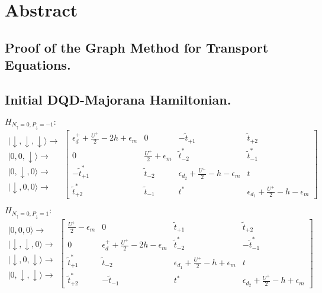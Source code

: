 \chapter{Abstract}



\section{Proof of the Graph Method for Transport Equations.\label{sec:AbsGraphmethod}}



\section{Initial DQD-Majorana Hamiltonian.\label{chap:Double-Dot-Majorana-Hamiltonian.}}

$H_{N_{\uparrow}=0,P_{\downarrow}=-1}:$
\[
\begin{array}{c}
\vert\downarrow,\downarrow,\downarrow\rangle\rightarrow\\
\vert0,0,\downarrow\rangle\rightarrow\\
\vert0,\downarrow,0\rangle\rightarrow\\
\vert\downarrow,0,0\rangle\rightarrow
\end{array}\left[\begin{array}{cccc}
\epsilon_{d}^{+}+\frac{U^{+}}{2}-2h+\epsilon_{m} & 0 & -\tilde{t}_{+1} & \tilde{t}_{+2}\\
0 & \frac{U^{+}}{2}+\epsilon_{m} & \tilde{t}_{-2}^{*} & \tilde{t}_{-1}^{*}\\
-\tilde{t}_{+1}^{*} & \tilde{t}_{-2} & \epsilon_{d_{2}}+\frac{U^{+}}{2}-h-\epsilon_{m} & t\\
\tilde{t}_{+2}^{*} & \tilde{t}_{-1} & t^{*} & \epsilon_{d_{1}}+\frac{U^{+}}{2}-h-\epsilon_{m}
\end{array}\right]
\]


$H_{N_{\uparrow}=0,P_{\downarrow}=1}:$
\[
\begin{array}{c}
\vert0,0,0\rangle\rightarrow\\
\vert\downarrow,\downarrow,0\rangle\rightarrow\\
\vert\downarrow,0,\downarrow\rangle\rightarrow\\
\vert0,\downarrow,\downarrow\rangle\rightarrow
\end{array}\left[\begin{array}{cccc}
\frac{U^{+}}{2}-\epsilon_{m} & 0 & \tilde{t}_{+1} & \tilde{t}_{+2}\\
0 & \epsilon_{d}^{+}+\frac{U^{+}}{2}-2h-\epsilon_{m} & \tilde{t}_{-2}^{*} & -\tilde{t}_{-1}^{*}\\
\tilde{t}_{+1}^{*} & \tilde{t}_{-2} & \epsilon_{d_{1}}+\frac{U^{+}}{2}-h+\epsilon_{m} & t\\
\tilde{t}_{+2}^{*} & -\tilde{t}_{-1} & t^{*} & \epsilon_{d_{2}}+\frac{U^{+}}{2}-h+\epsilon_{m}
\end{array}\right]
\]


